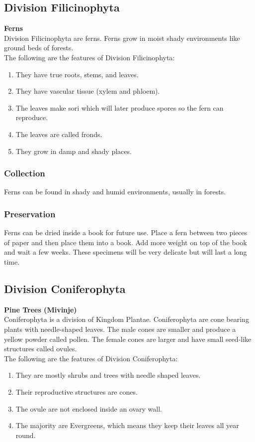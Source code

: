 \subsection{Division Filicinophyta}
\textbf{Ferns}\\
Division Filicinophyta are ferns. Ferns grow in moist shady environments like ground beds of forests. \\
The following are the features of Division Filicinophyta:
\begin{enumerate}
\item{They have true roots, stems, and leaves.}
\item{They have vascular tissue (xylem and phloem).}
\item{The leaves make sori which will later produce spores so the fern can reproduce.}
\item{The leaves are called fronds.}
\item{They grow in damp and shady places.}
\end{enumerate}

\subsubsection{Collection}
Ferns can be found in shady and humid environments, usually in forests. 

\subsubsection*{Preservation} 
Ferns can be dried inside a book for future use. Place a fern between two pieces of paper and then place them into a book. Add more weight on top of the book and wait a few weeks. These specimens will be very delicate but will last a long time.

\subsection{Division Coniferophyta}
\textbf{Pine Trees (Mivinje)}\\
 Coniferophyta is a division of Kingdom Plantae. Coniferophyta are cone bearing plants with needle-shaped leaves. The male cones are smaller and produce a yellow powder called pollen. The female cones are larger and have small seed-like structures called ovules.\\
The following are the features of Division Coniferophyta:
\begin{enumerate}
\item{They are mostly shrubs and trees with needle shaped leaves.}
\item{Their reproductive structures are cones.}
\item{The ovule are not enclosed inside an ovary wall.}
\item{The majority are Evergreens, which means they keep their leaves all year round.}
\end{enumerate}

